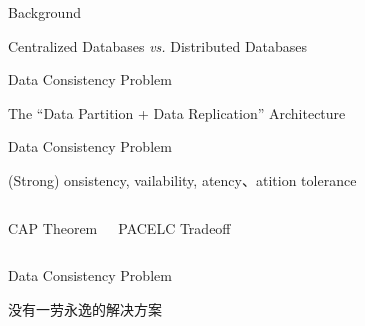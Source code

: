 
\begin{frame}{Background}
	\begin{center}
		Centralized Databases \emph{vs.} Distributed Databases

	\end{center}
\end{frame}

\begin{frame}{Data Consistency Problem}
	\begin{center}
		The ``Data Partition + Data Replication'' Architecture

		\pause
	\end{center}
\end{frame}

\begin{frame}{Data Consistency Problem}
	\begin{center}
		(Strong) \underline{}onsistency, \underline{}vailability,
		\underline{}atency、\underline{}atition tolerance
	\end{center}
	\begin{columns}[c]
		\begin{center}
			CAP Theorem \\[2pt]
		\end{center}
		\begin{center}

			\vspace{0.50cm}
			PACELC Tradeoff \\[2pt]
		\end{center}
	\end{columns}
\end{frame}

\begin{frame}{Data Consistency Problem}
	\begin{center}

		\vspace{0.30cm}
		没有一劳永逸的解决方案
	\end{center}
\end{frame}

